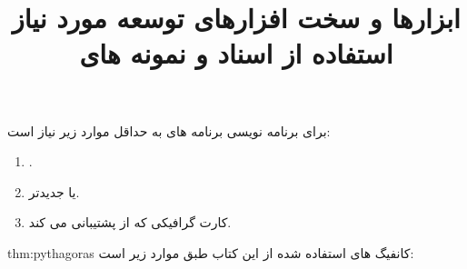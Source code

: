 \title{
    \LARGE
    \textbf{ابزارها و سخت افزارهای توسعه مورد نیاز}
} \rullFillWithLine[0.5em]{1pt}
\textbf{\vspace{12pt}}

{
    \Large
    برای برنامه نویسی برنامه های  به حداقل موارد زیر نیاز است:
    \begin{enumerate}
        \item {.}
        \item { یا جدیدتر.}
        \item {کارت گرافیکی که از  پشتیبانی می کند.}
    \end{enumerate}
}

\textbf{\vspace{12pt}}
\begin{theo}{thm:pythagoras}
    \Large
    کانفیگ های استفاده شده از این کتاب طبق موارد زیر است:
\end{theo}
\textbf{\vspace{25pt}}


\title{
    \LARGE
    \textbf{استفاده از اسناد  و نمونه های }
} \rullFillWithLine[0.5em]{1pt}
\textbf{\vspace{12pt}}

